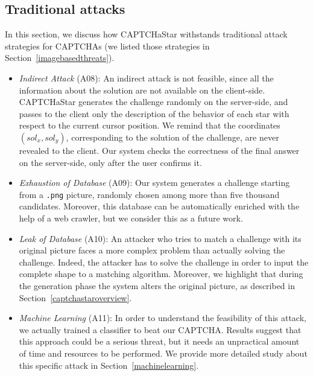 \documentclass[conference]{IEEEtran}
\begin{document}
\subsection{Traditional attacks}
\label{evaluatesecurity}
In this section, we discuss how CAPTCHaStar withstands traditional attack strategies for CAPTCHAs (we listed those strategies in Section~\ref{imagebasedthreats}).
\begin{itemize}
\item\textit{Indirect Attack} (A08): An indirect attack is not feasible, since all the information about the solution are not available on the client-side. 
CAPTCHaStar generates the challenge randomly on the server-side, and passes to the client only the description of the behavior of each star with respect to the current cursor position.
We remind that the coordinates $(sol_x, sol_y)$, corresponding to the solution of the challenge, are never revealed to the client.
Our system checks the correctness of the final answer on the server-side, only after the user confirms it. 

\item\textit{Exhaustion of Database} (A09): Our system generates a challenge starting from a \texttt{.png} picture, randomly chosen among more than five thousand candidates.
Moreover, this database can be automatically enriched with the help of a web crawler, but we consider this as a future work.

\item\textit{Leak of Database} (A10): An attacker who tries to match a challenge with its original picture faces a more complex problem than actually solving the challenge. 
Indeed, 
the attacker has to solve the challenge in order to input the complete shape to a matching algorithm.
Moreover, we highlight that during the generation phase the system alters the original picture, as described in Section~\ref{captchastaroverview}.


\item\textit{Machine Learning} (A11): In order to understand the feasibility of this attack, we actually trained a classifier to beat our CAPTCHA. Results suggest that this approach could be a serious threat, but it needs an unpractical amount of time and resources to be performed. We provide more detailed study about this specific attack in Section~\ref{machinelearning}.


\end{itemize}
\end{document}
